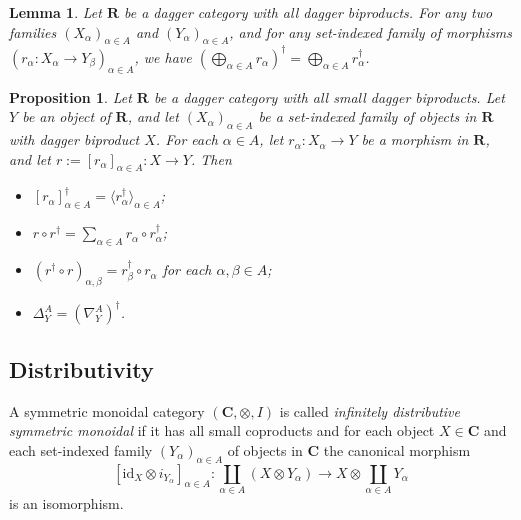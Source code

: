 \documentclass[12pt]{tac}
\newtheorem{lemma}[theorem]{Lemma}
\newtheorem{proposition}[theorem]{Proposition}
\theoremstyle{definition}
\theoremstyle{remark}
\newcommand{\<}{\langle}
\renewcommand{\>}{\rangle}
\renewcommand{\:}{\colon}
\newcommand{\id}{\mathrm{id}}
\begin{document}
\begin{lemma}\label{lem:dagger preserves dagger biproducts}
    Let $\mathbf R$ be a dagger category with all dagger biproducts. For any two families $(X_\alpha)_{\alpha\in A}$ and $(Y_\alpha)_{\alpha\in A}$, and for any set-indexed family of morphisms $(r_\alpha:X_\alpha\to Y_\beta)_{\alpha\in A}$, we have $\left(\bigoplus_{\alpha\in A}r_\alpha\right)^\dag=\bigoplus_{\alpha\in A}r_\alpha^\dag$.
\end{lemma}





\begin{proposition}\label{prop:dagger nabla and delta}
Let $\mathbf R$ be a dagger category with all small dagger biproducts. Let $Y$ be an object of $\mathbf R$, and let $(X_\alpha)_{\alpha\in A}$ be a set-indexed family of objects in $\mathbf R$ with dagger biproduct $X$. For each $\alpha\in A$, let $r_\alpha:X_\alpha\to Y$ be a morphism in $\mathbf R$, and let $r:=[r_\alpha]_{\alpha\in A}:X\to Y$. Then 
\begin{itemize}
    \item[(a)] $[r_\alpha]_{\alpha\in A}^\dag=\langle r_\alpha^\dag\rangle_{\alpha\in A}$;
    \item[(b)] $r\circ r^\dag=\sum_{\alpha\in A}r_\alpha\circ r_\alpha^\dag$;
    \item[(c)] $(r^\dag\circ r)_{\alpha,\beta}=r_\beta^\dag\circ r_\alpha$ for each $\alpha,\beta\in A$;
    \item[(d)] $\Delta^A_Y=(\nabla_Y^A)^\dag$.
\end{itemize} 
\end{proposition}












\subsection{Distributivity}

  A symmetric monoidal category $(\mathbf C,\otimes,I)$ is called \emph{infinitely distributive symmetric monoidal} if it has all small coproducts and for each object $X\in\mathbf C$ and each set-indexed family $(Y_\alpha)_{\alpha\in A}$ of objects in $\mathbf C$ the canonical morphism
    \[  [\id_X\otimes i_{Y_\alpha}]_{\alpha\in A}: \coprod_{\alpha\in A}(X\otimes Y_\alpha)\to X\otimes \coprod_{\alpha\in A}Y_\alpha   \]
    is an isomorphism. 
\end{document}

